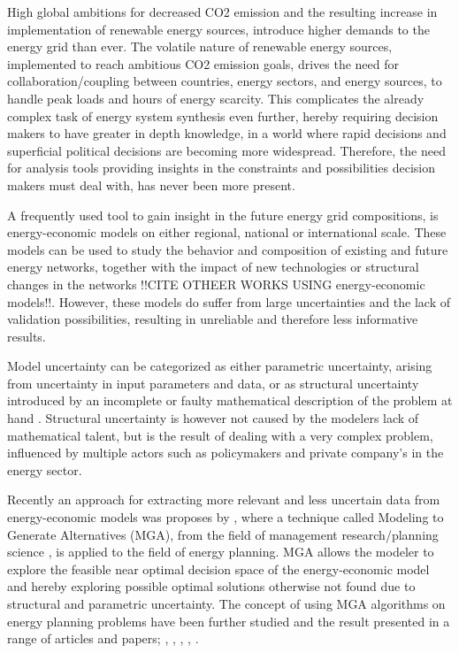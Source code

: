 

High global ambitions for decreased CO2 emission and the resulting increase in implementation of renewable energy sources, introduce higher demands to the energy grid than ever. The volatile nature of renewable energy sources, implemented to reach ambitious CO2 emission goals, drives the need for collaboration/coupling between countries, energy sectors, and energy sources, to handle peak loads and hours of energy scarcity. This complicates the already complex task of energy system synthesis even further, hereby requiring decision makers to have greater in depth knowledge, in a world where rapid decisions and superficial political decisions are becoming more widespread. Therefore, the need for analysis tools providing insights in the constraints and possibilities decision makers must deal with, has never been more present.  

A frequently used tool to gain insight in the future energy grid compositions, is energy-economic models on either regional, national or international scale. These models can be used to study the behavior and composition of existing and future energy networks, together with the impact of new technologies or structural changes in the networks \cite{Gorm_impact_of_CO2_PYPSA} !!CITE OTHEER WORKS USING energy-economic models!!. 
However, these models do suffer from large uncertainties and the lack of validation possibilities, resulting in unreliable and therefore less informative results. 

Model uncertainty can be categorized as either parametric uncertainty, arising from uncertainty in input parameters and data, or as structural uncertainty introduced by an incomplete or faulty mathematical description of the problem at hand \cite{DeCarolis_MGA} . Structural uncertainty is however not caused by the modelers lack of mathematical talent, but is the result of dealing with a very complex problem, influenced by multiple actors such as policymakers and private company's in the energy sector. 

Recently an approach for extracting more relevant and less uncertain data from energy-economic models was proposes by \citeauthor{DeCarolis_MGA}, where a technique called Modeling to Generate Alternatives (MGA), from the field of management research/planning science \cite{Brill_MGA_1982}, is applied to the field of energy planning. MGA allows the modeler to explore the feasible near optimal decision space of the energy-economic model and hereby exploring possible optimal solutions otherwise not found due to structural and parametric uncertainty. The concept of using MGA algorithms on energy planning problems have been further studied and the result presented in a range of articles and papers; \cite{DECAROLIS2016}, \cite{MGA}, \cite{BERNTSEN2017886}, \cite{Yavuz2011}, \cite{Optimum_not_enough}.

